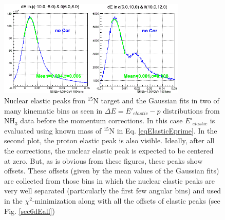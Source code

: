 \begin{figure}[H]%
\centering
  \leavevmode \includegraphics[width=0.8\textwidth]{figuresEG4/FigKineCor/elasticPeaksFromNH3wdWoCorEi0mN15gausCropped.png} 
  \caption[Nuclear elastic peak from $^{15}$N target]{Nuclear elastic peaks fron $^{15}$N target and the Gaussian fits in two
of many kinematic bins as seen in $\Delta E = E'_{elastic} - p$ distributions from NH$_3$ data before the momentum corrections.
In this case $E'_{elastic}$ is evaluated using known mass of $^{15}$N in Eq. \ref{eqElasticEprime}.
In the second plot, the proton elastic peak is also visible. Ideally, after all the corrections, the nuclear elastic peak is 
expected to be centered at zero. But, as is obvious from these figures, these peaks show offsets. These offsets (given
by the mean values of the Gaussian fits) are collected from those bins in which the nuclear elastic peaks are very well
separated (particularly the first few angular bins) and used in the $\chi^2$-minimization along with all the offsets of
elastic peaks (see Fig. \ref{sec6dEall})}
\label{sec6dEnucElastEbi0}
\end{figure}



